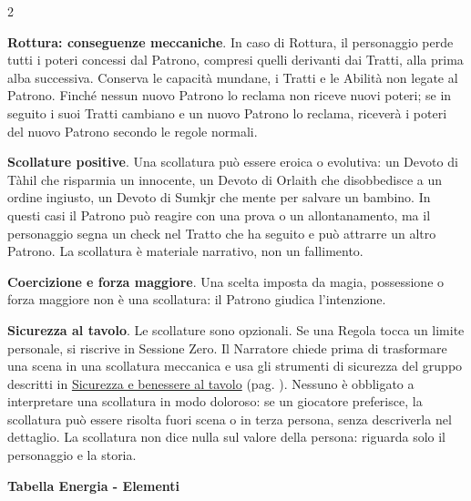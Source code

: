 \begin{multicols}{2}
\medskip

\textbf{Rottura: conseguenze meccaniche}. In caso di Rottura, il personaggio perde tutti i poteri concessi dal Patrono, compresi quelli derivanti dai Tratti, alla prima alba successiva. Conserva le capacità mundane, i Tratti e le Abilità non legate al Patrono. Finché nessun nuovo Patrono lo reclama non riceve nuovi poteri; se in seguito i suoi Tratti cambiano e un nuovo Patrono lo reclama, riceverà i poteri del nuovo Patrono secondo le regole normali.

\textbf{Scollature positive}. Una scollatura può essere eroica o evolutiva: un Devoto di Tàhil che risparmia un innocente, un Devoto di Orlaith che disobbedisce a un ordine ingiusto, un Devoto di Sumkjr che mente per salvare un bambino. In questi casi il Patrono può reagire con una prova o un allontanamento, ma il personaggio segna un check nel Tratto che ha seguito e può attrarre un altro Patrono. La scollatura è materiale narrativo, non un fallimento.

\textbf{Coercizione e forza maggiore}. Una scelta imposta da magia, possessione o forza maggiore non è una scollatura: il Patrono giudica l'intenzione.

\textbf{Sicurezza al tavolo}. Le scollature sono opzionali. Se una Regola tocca un limite personale, si riscrive in Sessione Zero. Il Narratore chiede prima di trasformare una scena in una scollatura meccanica e usa gli strumenti di sicurezza del gruppo descritti in \hyperlink{sicurezzatavolo}{Sicurezza e benessere al tavolo} (pag. \pageref{sicurezzatavolo}). Nessuno è obbligato a interpretare una scollatura in modo doloroso: se un giocatore preferisce, la scollatura può essere risolta fuori scena o in terza persona, senza descriverla nel dettaglio. La scollatura non dice nulla sul valore della persona: riguarda solo il personaggio e la storia.


\medskip

\textbf{Tabella Energia - Elementi}

\medskip


\end{multicols}
